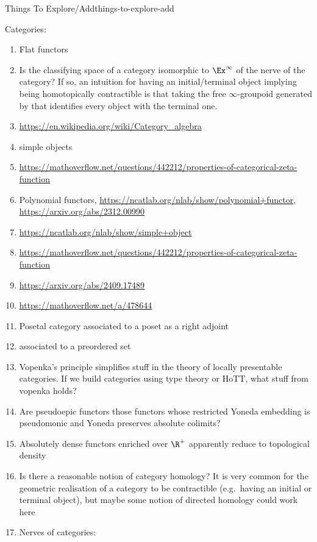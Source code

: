 \begin{remark}{Things To Explore/Add}{things-to-explore-add}
\begin{enumerate}
    \end{enumerate}
    Categories:
    \begin{enumerate}
        \item Flat functors
        \item Is the classifying space of a category isomorphic to $\Ex^{\infty}$ of the nerve of the category? If so, an intuition for having an initial/terminal object implying being homotopically contractible is that taking the free $\infty$-groupoid generated by that identifies every object with the terminal one.
        \item \url{https://en.wikipedia.org/wiki/Category_algebra}
        \item simple objects
        \item \url{https://mathoverflow.net/questions/442212/properties-of-categorical-zeta-function}
        \item Polynomial functors, \url{https://ncatlab.org/nlab/show/polynomial+functor}, \url{https://arxiv.org/abs/2312.00990}
        \item \url{https://ncatlab.org/nlab/show/simple+object}
        \item \url{https://mathoverflow.net/questions/442212/properties-of-categorical-zeta-function}
        \item \url{https://arxiv.org/abs/2409.17489}
        \item \url{https://mathoverflow.net/a/478644}
        \item Posetal category associated to a poset as a right adjoint
        \item {} associated to a preordered set
        \item Vopenka's principle simplifies stuff in the theory of locally presentable categories. If we build categories using type theory or HoTT, what stuff from vopenka holds?
        \item Are pseudoepic functors those functors whose restricted Yoneda embedding is pseudomonic and Yoneda preserves absolute colimits?
        \item Absolutely dense functors enriched over $\R^{+}$ apparently reduce to topological density
        \item Is there a reasonable notion of category homology? It is very common for the geometric realisation of a category to be contractible (e.g.\ having an initial or terminal object), but maybe some notion of directed homology could work here
        \item Nerves of categories:

\end{enumerate}
\end{remark}
